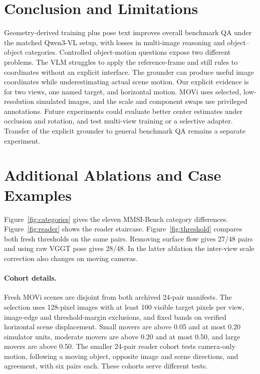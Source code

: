 \documentclass[10pt,letterpaper]{article}
\newif\ificmlstyle
\begin{document}
\section{Conclusion and Limitations}
Geometry-derived training plus pose text improves overall benchmark QA under the matched Qwen3-VL setup, with losses in multi-image reasoning and object--object categories. Controlled object-motion questions expose two different problems. The VLM struggles to apply the reference-frame and still rules to coordinates without an explicit interface. The grounder can produce useful image coordinates while underestimating actual scene motion. Our explicit evidence is for two views, one named target, and horizontal motion. MOVi uses selected, low-resolution simulated images, and the scale and component swaps use privileged annotations. Future experiments could evaluate better center estimates under occlusion and rotation, and test multi-view training or a selective adapter. Transfer of the explicit grounder to general benchmark QA remains a separate experiment.

\ificmlstyle
  \IfFileExists{icml2026.bst}{}{}
\else
  
\fi


\appendix
\section{Additional Ablations and Case Examples}
\label{app:figures}
Figure~\ref{fig:categories} gives the eleven MMSI-Bench category differences. Figure~\ref{fig:reader} shows the reader staircase. Figure~\ref{fig:threshold} compares both fresh thresholds on the same pairs. Removing surface flow gives 27/48 pairs and using raw VGGT pose gives 28/48. In the latter ablation the inter-view scale correction also changes on moving cameras.

\paragraph{Cohort details.}
Fresh MOVi scenes are disjoint from both archived 24-pair manifests. The selection uses 128-pixel images with at least 100 visible target pixels per view, image-edge and threshold-margin exclusions, and fixed bands on verified horizontal scene displacement. Small movers are above 0.05 and at most 0.20 simulator units, moderate movers are above 0.20 and at most 0.50, and large movers are above 0.50. The smaller 24-pair reader cohort tests camera-only motion, following a moving object, opposite image and scene directions, and agreement, with six pairs each. These cohorts serve different tests.
\end{document}

